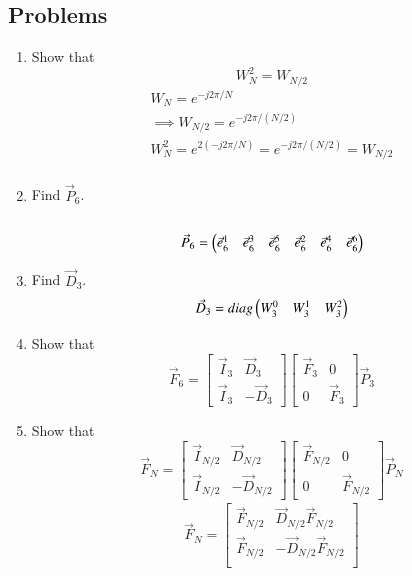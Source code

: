 \documentclass[journal,12pt,twocolumn]{IEEEtran}
\renewcommand\thesection{\arabic{section}}
\begin{document}
\subsection{Problems}
\begin{enumerate}[label=\arabic*.,ref=\thesection.\theenumi]
	\item Show that 
	\begin{equation}
		W_{N}^{2}=W_{N/2}
	\end{equation}
	\begin{align}
			W_{N} = e^{-j2\pi/N}\\
			\implies W_{N/2} = e^{-j2\pi/(N/2)}\\
			W_{N}^{2} = e^{2 (-j2\pi/N)} = e^{-j2\pi/(N/2)} = W_{N/2}\\
	\end{align}
	\item Find $\vec{P}_6$.\\
	\solution\\
	\begin{align}
		\vec{P}_{6} = \begin{pmatrix}\vec{e}_6^{1} &\vec{e}_6^{3} &\vec{e}_6^{5} &\vec{e}_6^{2}
			&\vec{e}_6^{4} &\vec{e}_6^{6}\end{pmatrix}
	\end{align}
	
	\item Find $\vec{D}_3$.\\
	\solution 	
	\begin{align}
		\vec{D}_3 = diag\begin{pmatrix}W_{3}^{0} & W_{3}^{1} & W_{3}^{2}\end{pmatrix}
	\end{align}
	\item Show that 
	\begin{equation}
		\vec{F}_{6}=
		\begin{bmatrix}
			\vec{I}_{3} & \vec{D}_{3} \\
			\vec{I}_{3} & -\vec{D}_{3}
		\end{bmatrix}
		\begin{bmatrix}
			\vec{F}_{3} & 0 \\
			0 & \vec{F}_{3}
		\end{bmatrix}
		\vec{P}_{3}
	\end{equation}
	\item Show that 
	\begin{equation}
		\vec{F}_{N}=
		\begin{bmatrix}
			\vec{I}_{N/2} & \vec{D}_{N/2} \\
			\vec{I}_{N/2} & -\vec{D}_{N/2}
		\end{bmatrix}
		\begin{bmatrix}
			\vec{F}_{N/2} & 0 \\
			0 & \vec{F}_{N/2}
		\end{bmatrix}
		\vec{P}_{N}
	\end{equation}
\solution
\begin{align}
		\vec{F}_N = 
		\begin{bmatrix}
				\vec{F}_{N/2} & \vec{D}_{N/2} \vec{F}_{N/2}\\
				\vec{F}_{N/2} & -\vec{D}_{N/2} \vec{F}_{N/2}\\
		\end{bmatrix}
\end{align}


\end{enumerate}
\end{document}

